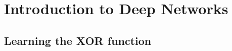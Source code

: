 \renewcommand{\prevpart}{1 }
\renewcommand{\thispart}{2 }
\renewcommand{\nextpart}{3 }

\section{Introduction to Deep Networks}





\subsection{Learning the XOR function}




